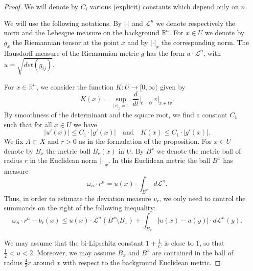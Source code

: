 \documentclass[12pt,leqno,intlimits]{amsart}
\numberwithin{equation}{section}
\theoremstyle{definition}
\theoremstyle{remark}
\newcommand{\R}{\mathbb{R}}
\def\:{\colon}
\begin{document}
\begin{proof}
We will denote by $C_i$ various (explicit) constants which depend only on $n$.

We will use the following notations. By $|\cdot|$ and $\mathcal L^n$ we denote respectively the norm and the Lebesgue measure on the background $\R^n$.
For $x\in U$ we denote by $g_x$ the Riemannian tensor at the point $x$ and
by $|\cdot |_x$ the corresponding norm. %
The Hausdorff measure of the Riemannian metric
$g$ has the form $u\cdot \mathcal L^n$, with $u=\sqrt {det (g_{ij})}$.

For $x\in \R^n$, we consider the function $K \:U\to [0,\infty)$ given by
$$K (x)=\sup _{|v|_x =1}\, \frac d {dt}\Big |_{t=0} |v| _{x+tv}.$$
By smoothness of the determinant and the square root,
we find a constant $C_1$ such that for all $x\in U$ we have
\begin{equation} \label{eq:Kg}
|u' (x)| \leq C_1\cdot |g' (x)|
\quad\text{and}\quad
K (x) \leq C_1 \cdot |g' (x)|.
\end{equation}
We fix $A\subset X$ and $r>0$ as in the formulation of the proposition. For $x\in U$ denote by $B_x$
the metric ball $B_r(x)$ in $U$. By $B^x$ we denote the metric ball of radius $r$ in the Euclidean norm $|\cdot |_x$. In this Euclidean metric the ball $B^x$ has measure
$$\omega _n\cdot r^n =u(x)\cdot \int _{B^x} d\mathcal L^n.$$
Thus, in order to estimate the deviation measure $v_r$, we only need to control the summands on the right of the following inequality:
\begin{equation} \label{eq:summand}
\omega_n \cdot r^n - b_r (x) \leq u(x) \cdot \mathcal L^n( B^x\setminus B_x) + \int _{B_x} |u(x)- u(y)| \cdot
d\mathcal L^n (y).
\end{equation}

We may assume that the bi-Lipschitz constant $1+\frac 1 C$ is close to 1, so that $\frac 1 2 < u <2$. Moreover, we may assume $B_x$ and $B^x$ are contained in the ball of radius $\frac 4 3 r$ around $x$ with respect to the background Euclidean metric.


\end{proof}
\end{document}
